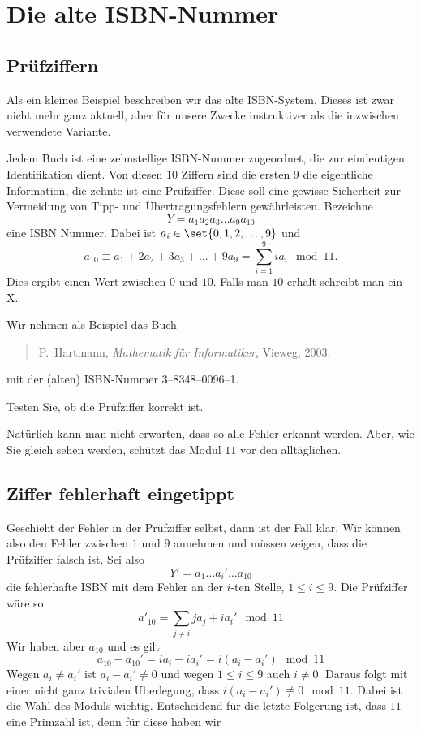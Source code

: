 \documentclass[%
11pt,%
twoside,%
titlepage,%
german,%
headsepline%
]{scrartcl}
\begin{document}
\clearpage

\section{Die alte ISBN-Nummer}
\subsection{Prüfziffern}

Als ein kleines Beispiel beschreiben wir das alte ISBN-System. Dieses ist zwar nicht mehr ganz aktuell, aber für unsere Zwecke instruktiver als die inzwischen verwendete Variante.

Jedem Buch ist eine zehnstellige ISBN-Nummer zugeordnet, die zur eindeutigen Identifikation dient. Von diesen $10$ Ziffern sind die ersten $9$ die eigentliche Information, die zehnte ist eine Prüfziffer. Diese soll eine gewisse Sicherheit zur Vermeidung von Tipp- und Übertragungsfehlern gewährleisten.
Bezeichne
$$Y=a_1a_2a_3\dots a_9a_{10}$$
eine ISBN Nummer. Dabei ist $a_i\in\set{0,1,2,\dots,9}$ und
$$a_{10}\equiv a_1+2a_2+3a_3+\dots+9a_9=\sum_{i=1}^9ia_i\mod11.$$
Dies ergibt einen Wert zwischen $0$ und $10$. Falls man $10$ erhält schreibt man ein X.

\begin{bsp}
Wir nehmen als Beispiel das Buch
\begin{quote}
P.~Hartmann, \emph{Mathematik für Informatiker}, Vieweg, 2003.
\end{quote}
mit der (alten) ISBN-Nummer 3--8348--0096--1.
\begin{frage}
Testen Sie, ob die Prüfziffer korrekt ist.
\end{frage}
\end{bsp}

\noindent Natürlich kann man nicht erwarten, dass so alle Fehler erkannt werden. Aber, wie Sie gleich sehen werden, schützt das Modul $11$ vor den alltäglichen.

\subsection{Ziffer fehlerhaft eingetippt}

Geschieht
der Fehler in der Prüfziffer selbst, dann ist der Fall klar. Wir können also den Fehler zwischen $1$ und $9$ annehmen und müssen zeigen, dass die Prüfziffer falsch ist. Sei also
$$Y'=a_1\dots a_i'\dots a_{10}$$
die fehlerhafte ISBN mit dem Fehler an der $i$-ten Stelle, $1\leq i\leq9$. Die Prüfziffer wäre so
$$a'_{10}=\sum_{j\neq i}ja_j+ia_i'\mod11$$
Wir haben aber $a_{10}$ und es gilt
$$a_{10}-a_{10}'=ia_i-ia_i'=i(a_i-a_i')\mod11$$
Wegen $a_i\neq a_i'$ ist $a_i-a_i'\neq0$ und wegen $1\leq i\leq9$ auch $i\neq0$. Daraus folgt mit einer nicht ganz trivialen Überlegung, dass $i(a_i-a_i')\not\equiv0\mod11$. Dabei ist die Wahl des Moduls wichtig. Entscheidend für die letzte Folgerung ist, dass $11$ eine Primzahl ist, denn für diese haben wir
\end{document}
